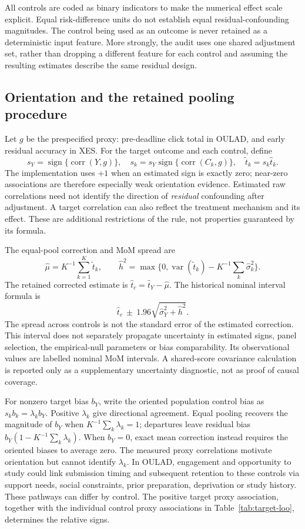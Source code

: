 All controls are coded as binary indicators to make the numerical effect scale explicit. Equal risk-difference units do not establish equal residual-confounding magnitudes. The control being used as an outcome is never retained as a deterministic input feature. More strongly, the audit uses one shared adjustment set, rather than dropping a different feature for each control and assuming the resulting estimates describe the same residual design.

\subsection{Orientation and the retained pooling procedure}

Let $g$ be the prespecified proxy: pre-deadline click total in OULAD, and early residual accuracy in XES. For the target outcome and each control, define
\[
s_Y=\operatorname{sign}\{\operatorname{corr}(Y,g)\},\quad
s_k=s_Y\operatorname{sign}\{\operatorname{corr}(C_k,g)\},\quad
\widetilde t_k=s_k\widehat t_k.
\]
The implementation uses $+1$ when an estimated sign is exactly zero; near-zero associations are therefore especially weak orientation evidence. Estimated raw correlations need not identify the direction of \emph{residual} confounding after adjustment. A target correlation can also reflect the treatment mechanism and its effect. These are additional restrictions of the rule, not properties guaranteed by its formula.

The equal-pool correction and MoM spread are
\[
\widehat\mu=K^{-1}\sum_{k=1}^K\widetilde t_k,\qquad
\widehat h^2=\max\{0,\operatorname{var}(\widetilde t_k)-K^{-1}\sum_k\widehat\sigma_k^2\}.
\]
The retained corrected estimate is $\widehat t_c=\widehat t_Y-\widehat\mu$. The historical nominal interval formula is
\[
\widehat t_c\ \pm\ 1.96\sqrt{\widehat\sigma_Y^2+\widehat h^2}.
\]
The spread across controls is not the standard error of the estimated correction. This interval does not separately propagate uncertainty in estimated signs, panel selection, the empirical-null parameters or bias comparability. Its observational values are labelled nominal MoM intervals. A shared-score covariance calculation is reported only as a supplementary uncertainty diagnostic, not as proof of causal coverage.

For nonzero target bias $b_Y$, write the oriented population control bias as
$s_k b_k=\lambda_k b_Y$. Positive $\lambda_k$ give directional agreement. Equal pooling recovers the magnitude of $b_Y$ when $K^{-1}\sum_k\lambda_k=1$; departures leave residual bias $b_Y(1-K^{-1}\sum_k\lambda_k)$. When $b_Y=0$, exact mean correction instead requires the oriented biases to average zero. The measured proxy correlations motivate orientation but cannot identify $\lambda_k$. In OULAD, engagement and opportunity to study could link submission timing and subsequent retention to these controls via support needs, social constraints, prior preparation, deprivation or study history. These pathways can differ by control. The positive target proxy association, together with the individual control proxy associations in Table~\ref{tab:target-loo}, determines the relative signs.

